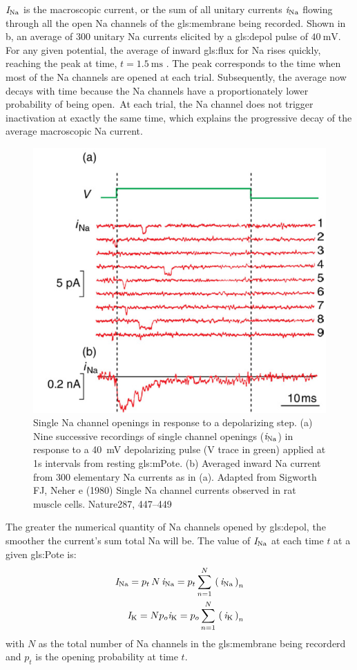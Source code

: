 \documentclass[class={myRUCProject}, crop=false]{standalone}
\begin{document}
{}\(\mathit{I}_\mathrm{Na}\) is the macroscopic current, or the sum of all unitary currents \(\mathit{i}_\mathrm{Na}\) flowing through all the open \gls{Na} channels of the \gls{gls:membrane} being recorded. Shown in b, an average of \(\num{300}\) unitary \gls{Na} currents elicited by a \gls{gls:depol} pulse of \(\qty{40}{\mV}\). 
For any given potential, the average of inward \gls{gls:flux} for \gls{Na} rises quickly, reaching the peak at time, \(t=\qty{1.5}{\ms}\) \cite{Hammond2015ch4}. 
The peak corresponds to the time when most of the \gls{Na} channels are opened at each trial. 
Subsequently, the average now decays with time because the \gls{Na} channels have a proportionately lower probability of being open.\footnotemark~At each trial, the \gls{Na} channel does not trigger inactivation at exactly the same time, which explains the progressive decay of the average macroscopic \gls{Na} current. 

\begin{figure}[H]
  \centering
  \includegraphics[width=0.5\linewidth]{Pictures//Anakin/iNa.png}
  \caption{Single \gls{Na} channel openings in response to a depolarizing step. (a) Nine successive recordings of single channel openings (\(\mathit{i}_\mathrm{Na}\)) in response to a \qty{40}{\mV} depolarizing pulse (V trace in green) applied at 1s intervals from resting \gls{gls:mPote}. (b) Averaged inward \gls{Na} current from 300 elementary \gls{Na} currents as in (a). Adapted from Sigworth FJ, Neher e (1980) Single \gls{Na} channel currents observed in rat muscle cells. Nature287, 447–449 }
  \label{fig:unitcurNa}
\end{figure}

The greater the numerical quantity of \gls{Na} channels opened by \gls{gls:depol}, the smoother the current's sum total \gls{Na} will be. 
The value of \(\mathit{I}_\mathrm{Na}\) at each time \(t\) at a given \gls{gls:Pote} is: 
\begin{align}
    \mathit{I}_\mathrm{Na} = p_t \, N \, \mathit{i}_\mathrm{Na} = p_t \sum^N_{n=1} \, \left(\,\mathit{i}_\mathrm{Na}\,\right)_n \label{eq:nasum}\\
    \mathit{I}_\mathrm{K} = N p_o \mathit{i}_\mathrm{K} = p_o \sum^N_{n=1} \, \left(\,\mathit{i}_\mathrm{K}\,\right)_n \label{eq:ksum}
\end{align}
with \(N\) as the total number of \gls{Na} channels in the \gls{gls:membrane} being recorderd and \(p_t\) is the opening probability at time \(t\). 
\end{document}
